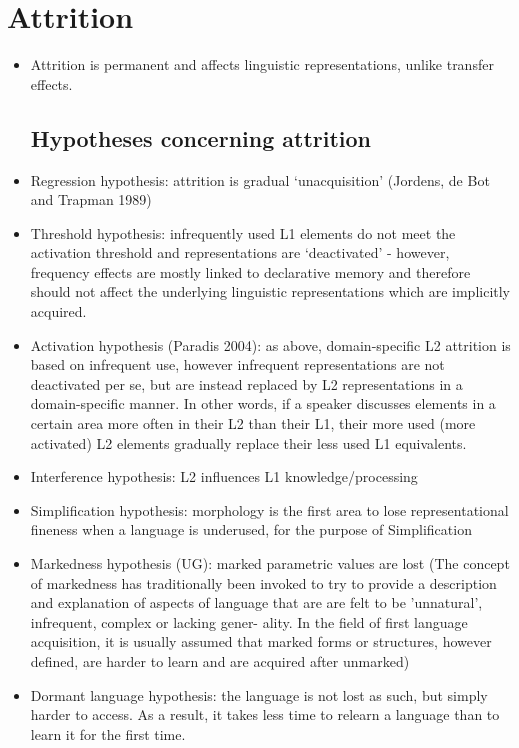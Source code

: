 \documentclass{article}
\begin{document}
\section{Attrition}
\begin{itemize}
    \item Attrition is permanent and affects linguistic representations, unlike transfer effects.
    \subsection{Hypotheses concerning attrition}
    \item Regression hypothesis: attrition is gradual `unacquisition' (Jordens, de Bot and Trapman 1989)
    \item Threshold hypothesis: infrequently used L1 elements do not meet the activation threshold and representations are `deactivated' - however, frequency effects are mostly linked to declarative memory and therefore should not affect the underlying linguistic representations which are implicitly acquired.
    \item Activation hypothesis (Paradis 2004): as above, domain-specific L2 attrition is based on infrequent use, however infrequent representations are not deactivated per se, but are instead replaced by L2 representations in a domain-specific manner. In other words, if a speaker discusses elements in a certain area more often in their L2 than their L1, their more used (more activated) L2 elements gradually replace their less used L1 equivalents.
    \item Interference hypothesis: L2 influences L1 knowledge/processing
    \item Simplification hypothesis: morphology is the first area to lose representational fineness when a language is underused, for the purpose of Simplification
    \item Markedness hypothesis (UG): marked parametric values are lost (The concept of markedness has traditionally been invoked to try
        to provide a description and explanation of aspects of language that
        are are felt to be 'unnatural', infrequent, complex or lacking gener-
        ality. In the field of first language acquisition, it is usually
        assumed that marked forms or structures, however defined, are harder
        to learn and are acquired after unmarked)
    \item Dormant language hypothesis: the language is not lost as such, but simply harder to access. As a result, it takes less time to relearn a language than to learn it for the first time.

\end{itemize}
\end{document}
